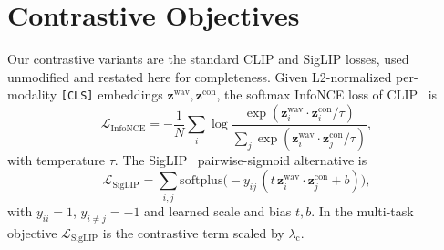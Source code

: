 \documentclass[conference]{IEEEtran}
\begin{document}
\section{Contrastive Objectives}
\label{app:contrastive}
Our contrastive variants are the standard CLIP and SigLIP losses, used unmodified
and restated here for completeness. Given L2-normalized per-modality \texttt{[CLS]}
embeddings $\bm{z}^{\text{wav}}, \bm{z}^{\text{con}}$, the softmax InfoNCE loss of
CLIP~\cite{clip} is
\begin{equation}
\mathcal{L}_{\text{InfoNCE}} = -\frac{1}{N}\sum_i
\log\frac{\exp(\bm{z}^{\text{wav}}_i\!\cdot \bm{z}^{\text{con}}_i/\tau)}
{\sum_j \exp(\bm{z}^{\text{wav}}_i\!\cdot \bm{z}^{\text{con}}_j/\tau)},
\end{equation}
with temperature $\tau$. The SigLIP~\cite{siglip} pairwise-sigmoid alternative is
\begin{equation}
\mathcal{L}_{\text{SigLIP}} = \sum_{i,j}\mathrm{softplus}\!\big(-y_{ij}\,(t\,
\bm{z}^{\text{wav}}_i\!\cdot\bm{z}^{\text{con}}_j + b)\big),
\end{equation}
with $y_{ii}=1$, $y_{i\neq j}=-1$ and learned scale and bias $t,b$. In the
multi-task objective $\mathcal{L}_{\text{SigLIP}}$ is the contrastive term scaled by
$\lambda_{\text{c}}$.
\end{document}
